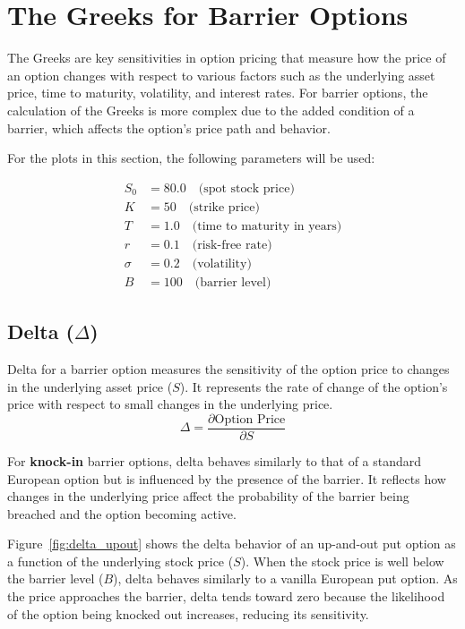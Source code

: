 \chapter{The Greeks for Barrier Options}
\label{sec:greeks}

The Greeks are key sensitivities in option pricing that measure how the price of an option changes with respect to various factors such as the underlying asset price, time to maturity, volatility, and interest rates. For barrier options, the calculation of the Greeks is more complex due to the added condition of a barrier, which affects the option's price path and behavior.

For the plots in this section, the following parameters will be used:

\[
\begin{aligned}
S_0 &= 80.0 \quad \text{(spot stock price)} \\
K &= 50 \quad \text{(strike price)} \\
T &= 1.0 \quad \text{(time to maturity in years)} \\
r &= 0.1 \quad \text{(risk-free rate)} \\
\sigma &= 0.2 \quad \text{(volatility)} \\
B &= 100 \quad \text{(barrier level)}
\end{aligned}
\]




\section{Delta (\(\Delta\))}

Delta for a barrier option measures the sensitivity of the option price to changes in the underlying asset price (\(S\)). It represents the rate of change of the option's price with respect to small changes in the underlying price.
\[
\Delta = \frac{\partial \text{Option Price}}{\partial S}
\]

For \textbf{knock-in} barrier options, delta behaves similarly to that of a standard European option but is influenced by the presence of the barrier. It reflects how changes in the underlying price affect the probability of the barrier being breached and the option becoming active.

Figure~\ref{fig:delta_upout} shows the delta behavior of an up-and-out put option as a function of the underlying stock price (\(S\)). When the stock price is well below the barrier level (\(B\)), delta behaves similarly to a vanilla European put option. As the price approaches the barrier, delta tends toward zero because the likelihood of the option being knocked out increases, reducing its sensitivity.

